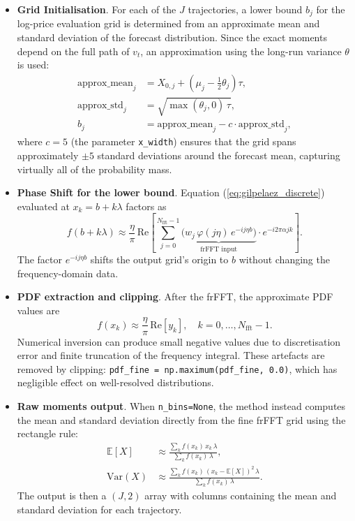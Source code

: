 \begin{itemize}
    \item \textbf{Grid Initialisation}. For each of the $J$ trajectories, a lower bound $b_j$ for the log-price evaluation grid is determined from an approximate mean and standard deviation of the forecast distribution. Since the exact moments depend on the full path of $v_t$, an approximation using the long-run variance $\theta$ is used:
    \begin{align}
        \text{approx\_mean}_j &= X_{0,j} + \left(\mu_j - \tfrac{1}{2}\theta_j\right)\tau, \label{eq:approx_mean}\\
        \text{approx\_std}_j  &= \sqrt{\max(\theta_j, 0)\,\tau}, \label{eq:approx_std}\\
        b_j &= \text{approx\_mean}_j - c\cdot\text{approx\_std}_j, \label{eq:lower_bound}
    \end{align}
    where $c = 5$ (the parameter \texttt{x\_width}) ensures that the grid spans approximately $\pm 5$ standard deviations around the forecast mean, capturing virtually all of the probability mass.
    \item \textbf{Phase Shift for the lower bound}. Equation (\ref{eq:gilpelaez_discrete}) evaluated at $x_k = b + k\lambda$ factors as
    \begin{equation}
    f(b + k\lambda) \approx \frac{\eta}{\pi}\,\text{Re}\!\left[\sum_{j=0}^{N_\text{fft}-1} \underbrace{\bigl(w_j\,\varphi(j\eta)\,e^{-ij\eta b}\bigr)}_{\text{frFFT input}} \cdot e^{-i2\pi\alpha jk}\right].
    \label{eq:phase_shifted}
    \end{equation}
    The factor $e^{-ij\eta b}$ shifts the output grid's origin to $b$ without changing the frequency-domain data. 
    \item \textbf{PDF extraction and clipping}. After the frFFT, the approximate PDF values are
    \begin{equation}
    f(x_k) \approx \frac{\eta}{\pi}\,\text{Re}\!\left[y_k\right], \quad k = 0, \ldots, N_\text{fft}-1.
    \label{eq:pdf_extract}
    \end{equation}
    Numerical inversion can produce small negative values due to discretisation error and finite truncation of the frequency integral. These artefacts are removed by clipping: \texttt{pdf\_fine = np.maximum(pdf\_fine, 0.0)}, which has negligible effect on well-resolved distributions.
    \item \textbf{Raw moments output}. When \texttt{n\_bins=None}, the method instead computes the mean and standard deviation directly from the fine frFFT grid using the rectangle rule:
    \begin{align}
    \mathbb{E}[X] &\approx \frac{\sum_k f(x_k)\,x_k\,\lambda}{\sum_k f(x_k)\,\lambda}, \label{eq:raw_mean}\\
    \text{Var}(X) &\approx \frac{\sum_k f(x_k)\,(x_k - \mathbb{E}[X])^2\,\lambda}{\sum_k f(x_k)\,\lambda}. \label{eq:raw_var}
    \end{align}
    The output is then a $(J, 2)$ array with columns containing the mean and standard deviation for each trajectory.
\end{itemize}




